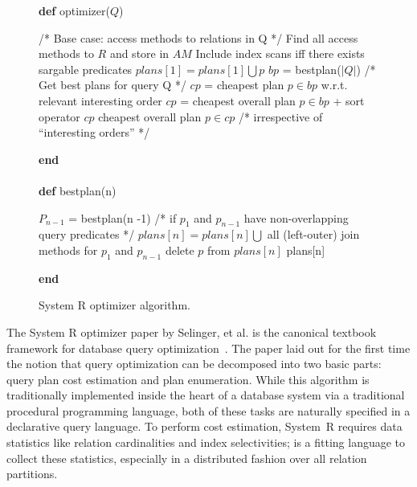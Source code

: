 \begin{figure}
\ssp
\centering
\begin{boxedminipage}{\linewidth}
  {\bf def} optimizer($Q$)
    \begin{algorithmic}[1]
      	\STATE /* Base case: access methods to relations in Q */
		\STATE Find all access methods to $R$ and store in $AM$
		\STATE Include index scans iff there exists sargable predicates 
  	\ENDFOR
	\STATE
			\STATE $plans[1] = plans[1] \bigcup p$ 
		\ENDIF
 	\ENDFOR
	\STATE
	\STATE $bp$ = bestplan($|Q|$) /* Get best plans for query Q */
	 	\STATE $cp$ = cheapest plan $p \in bp$ w.r.t. relevant interesting order 
			\STATE $cp$ = cheapest overall plan $p \in bp$ + sort operator
		\ENDIF
		\RETURN $cp$
	\ELSE
	 	\RETURN cheapest overall plan $p \in cp$ /* irrespective of ``interesting orders'' */ 
	\ENDIF
    \end{algorithmic}
  {\bf end} \\
  \\
  {\bf def} bestplan(n)
    \begin{algorithmic}[1]
			\STATE $P_{n-1}$ = bestplan(n -1)
			\STATE /* if $p_1$ and $p_{n-1}$ have non-overlapping query predicates */
					\STATE $plans[n] = plans[n] \bigcup$ all (left-outer) join methods for $p_1$ and $p_{n-1}$
				\ENDIF
			\ENDFOR
		\ENDFOR
		\STATE
				\STATE delete $p$ from $plans[n]$
			\ENDIF
		\ENDFOR
	\ENDIF
	\RETURN plans[n]
      \end{algorithmic}
    {\bf end}
\end{boxedminipage}
\caption{\label{ch:evita:fig:systemr}System R optimizer algorithm.}
\end{figure}

The System R optimizer paper by Selinger, et al.  is the canonical textbook
framework for database query optimization~\cite{selinger}.  The paper laid out
for the first time the notion that query optimization can be decomposed into
two basic parts: query plan cost estimation and plan enumeration.  While this
algorithm is traditionally implemented inside the heart of a database system
via a traditional procedural programming language, both of these tasks are
naturally specified in a declarative query language.  To perform cost
estimation, System~R requires data statistics like relation cardinalities and
index selectivities; \OVERLOG is a fitting language to collect these
statistics, especially in a distributed fashion over all relation partitions.

